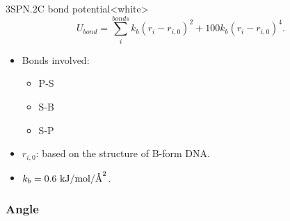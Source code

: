 \begin{smallpage}{3SPN.2C bond potential}<white>
  \begin{equation}
    \label{eq:dna_3spn2c_local_bond}
    U_{bond} = \sum_{i}^{bonds} k_b (r_i - r_{i,0})^2 + 100 k_b (r_i - r_{i,0})^4.
  \end{equation}
  \tcblower
  \begin{itemize}
  \item Bonds involved:
    \begin{itemize}
    \item P-S
    \item S-B
    \item S-P
    \end{itemize}
  \item $r_{i, 0}$: based on the structure of B-form DNA.
  \item $k_b = 0.6\ \mathrm{kJ/mol/\angstrom^2}$.
  \end{itemize}
\end{smallpage}



\subsubsection{Angle}
\label{sec:dna_3spn2c_potential_angle}

